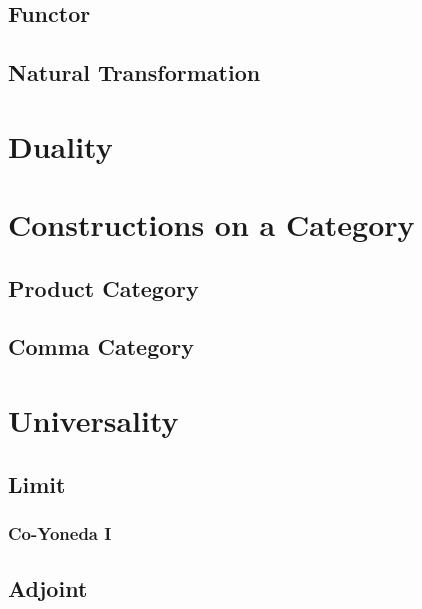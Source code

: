 \documentclass[a4paper,11pt,psamsfonts,reqno]{amsbook}
\theoremstyle{proposition}
\theoremstyle{proof}
\begin{document}
\subsection{Functor}
\label{sec:func}


\subsection{Natural Transformation}
\label{sec:nt}



\section{Duality}
\label{sec:duality}



\section{Constructions on a Category}
\label{sec:constoncat}


\subsection{Product Category}
\label{sec:prodcat}


\subsection{Comma Category}
\label{sec:comcat}



\section{Universality}
\label{sec:uni}


\subsection{Limit}
\label{sec:limit}

\subsubsection{Co-Yoneda I}
\label{sec:coyoneda1}


\subsection{Adjoint}
\label{sec:adjoint}

\end{document}
